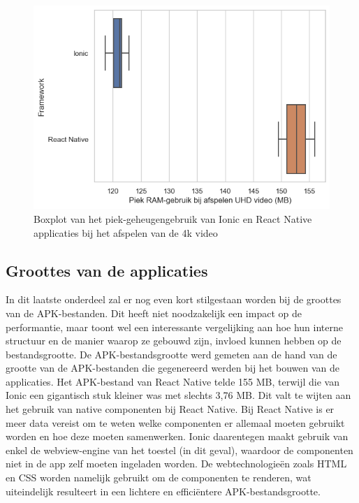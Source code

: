 \begin{figure}
  \centering
  \includegraphics[width=0.7\linewidth]{img/ram/4k}
  \caption{Boxplot van het piek-geheugengebruik van Ionic en React Native applicaties bij het afspelen van de 4k video}
  \label{fig:Boxplot van het piek-geheugengebruik van Ionic en React Native applicaties bij het afspelen van de 4k video}
\end{figure}


\subsection{Groottes van de applicaties}
\label{subsec:groottes-van-de-applicaties}

In dit laatste onderdeel zal er nog even kort stilgestaan worden bij de groottes van de APK-bestanden. Dit heeft niet noodzakelijk een impact op de performantie, maar toont wel een interessante vergelijking aan hoe hun interne structuur en de manier waarop ze gebouwd zijn, invloed kunnen hebben op de bestandsgrootte. De APK-bestandsgrootte werd gemeten aan de hand van de grootte van de APK-bestanden die gegenereerd werden bij het bouwen van de applicaties. Het APK-bestand van React Native telde 155 MB, terwijl die van Ionic een gigantisch stuk kleiner was met slechts 3,76 MB. Dit valt te wijten aan het gebruik van native componenten bij React Native. Bij React Native is er meer data vereist om te weten welke componenten er allemaal moeten gebruikt worden en hoe deze moeten samenwerken. Ionic daarentegen maakt gebruik van enkel de webview-engine van het toestel (in dit geval), waardoor de componenten niet in de app zelf moeten ingeladen worden. De webtechnologieën zoals HTML en CSS worden namelijk gebruikt om de componenten te renderen, wat uiteindelijk resulteert in een lichtere en efficiëntere APK-bestandsgrootte.